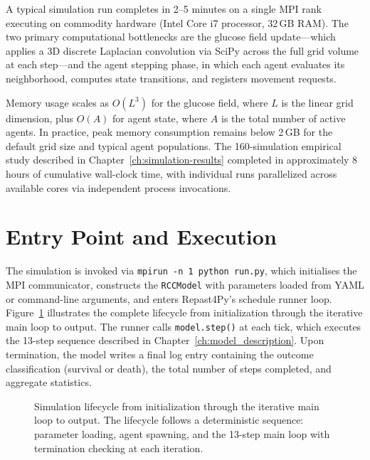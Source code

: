 A typical simulation run completes in 2--5 minutes on a single MPI rank executing on commodity hardware (Intel Core i7 processor, 32\,GB RAM).  The two primary computational bottlenecks are the glucose field update---which applies a 3D discrete Laplacian convolution via SciPy across the full grid volume at each step---and the agent stepping phase, in which each agent evaluates its neighborhood, computes state transitions, and registers movement requests.

Memory usage scales as $O(L^3)$ for the glucose field, where $L$ is the linear grid dimension, plus $O(A)$ for agent state, where $A$ is the total number of active agents.  In practice, peak memory consumption remains below 2\,GB for the default grid size and typical agent populations.  The 160-simulation empirical study described in Chapter~\ref{ch:simulation-results} completed in approximately 8 hours of cumulative wall-clock time, with individual runs parallelized across available cores via independent process invocations.

\section{Entry Point and Execution}
\label{sec:entry-point}

The simulation is invoked via \texttt{mpirun -n 1 python run.py}, which initialises the MPI communicator, constructs the \texttt{RCCModel} with parameters loaded from YAML or command-line arguments, and enters Repast4Py's schedule runner loop. Figure~\ref{fig:simulation_lifecycle} illustrates the complete lifecycle from initialization through the iterative main loop to output.  The runner calls \texttt{model.step()} at each tick, which executes the 13-step sequence described in Chapter~\ref{ch:model_description}.  Upon termination, the model writes a final log entry containing the outcome classification (survival or death), the total number of steps completed, and aggregate statistics.

\begin{figure}[htbp]
\centering
{}
\caption{Simulation lifecycle from initialization through the iterative main loop to output.  The lifecycle follows a deterministic sequence: parameter loading, agent spawning, and the 13-step main loop with termination checking at each iteration.}
\label{fig:simulation_lifecycle}
\end{figure}

